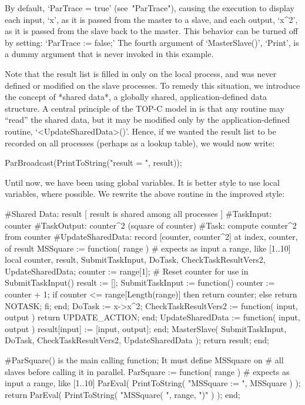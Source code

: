 By default, `ParTrace = true' (see~"ParTrace"), causing the execution  to
display each input, `x', as it is passed from the master to a slave,  and
each output, `x^2', as it is passed from the slave back  to  the  master.
This behavior can be turned off by  setting:  `ParTrace  :=  false;'  The
fourth argument of `MasterSlave()', `Print', is a dummy argument that  is
never invoked in this example.

Note that the result list is filled in only on the local process, and was
never defined  or  modified  on  the  slave  processes.  To  remedy  this
situation, we introduce the concept of *shared data*, a globally  shared,
application-defined data structure. A  central  principle  of  the  TOP-C
model in {\ParGAP} is that any routine may ``read'' the shared data,  but
it  may  be   modified   only   by   the   application-defined   routine,
`<UpdateSharedData>()'. Hence,  if  we  wanted  the  result  list  to  be
recorded on all processes (perhaps as  a  lookup  table),  we  would  now
write:

\beginexample
ParBroadcast(PrintToString("result = ", result));
\endexample


Until now, we have been using global variables.  It is better style to
use local variables, where possible.  We rewrite the above routine in
the improved style:

\beginexample
#Shared Data: result [ result is shared among all processes ]
#TaskInput:   counter
#TaskOutput:  counter^2 (square of counter)
#Task:        compute counter^2 from counter
#UpdateSharedData:  record [counter, counter^2] at index, counter, of result
MSSquare := function( range ) # expects as input a range, like [1..10]
  local counter, result,
      SubmitTaskInput, DoTask, CheckTaskResultVers2, UpdateSharedData;
  counter := range[1]; # Reset counter for use in SubmitTaskInput()
  result := [];
  SubmitTaskInput := function()
    counter := counter + 1;
    if counter <= range[Length(range)] then return counter;
    else return NOTASK;
    fi;
  end;
  DoTask := x->x^2;
  CheckTaskResultVers2 := function( input, output )
    return UPDATE_ACTION;
  end;
  UpdateSharedData := function( input, output )
    result[input] := [input, output];
  end;
  MasterSlave( SubmitTaskInput, DoTask, CheckTaskResultVers2, UpdateSharedData );
  return result;
end;

#ParSquare() is the main calling function;  It must define MSSquare on
#  all slaves before calling it in parallel.
ParSquare := function( range ) # expects as input a range, like [1..10]
  ParEval( PrintToString( "MSSquare := ", MSSquare ) );
  return ParEval( PrintToString( "MSSquare( ", range, ")" ) );
end;
\endexample

